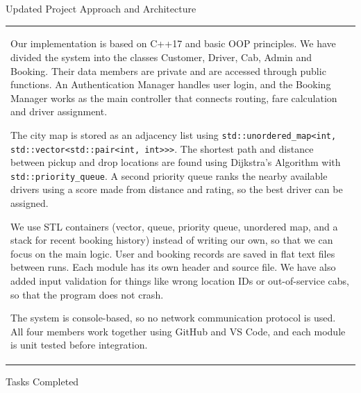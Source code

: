 \documentclass[12pt,a4paper]{article}
\newcommand{\sectiontitle}[1]{%
    {\color{GEUBlue}
    \fontsize{18}{22}\selectfont #1}
}
\newcommand{\answerbox}[2]{%
    \begin{tabularx}{\textwidth}{
        |>{\RaggedRight\arraybackslash}X|}
        \hline
        \parbox[t][#1][t]{\dimexpr\linewidth-12pt\relax}{
            \vspace{5pt}
            \fontsize{11}{13}\selectfont #2
        }\\
        \hline
    \end{tabularx}
}
\begin{document}
\vspace{0.70cm}

\sectiontitle{Updated Project Approach and Architecture}

\vspace{0.05cm}

\vspace{0.25cm}

\answerbox{7.60cm}{
Our implementation is based on C++17 and basic OOP principles. We have divided the system into the classes Customer, Driver, Cab, Admin and Booking. Their data members are private and are accessed through public functions. An Authentication Manager handles user login, and the Booking Manager works as the main controller that connects routing, fare calculation and driver assignment.

The city map is stored as an adjacency list using \texttt{std::unordered\_map<int, std::vector<std::pair<int, int>{}>{}>}. The shortest path and distance between pickup and drop locations are found using Dijkstra's Algorithm with \texttt{std::priority\_queue}. A second priority queue ranks the nearby available drivers using a score made from distance and rating, so the best driver can be assigned.

We use STL containers (vector, queue, priority queue, unordered map, and a stack for recent booking history) instead of writing our own, so that we can focus on the main logic. User and booking records are saved in flat text files between runs. Each module has its own header and source file. We have also added input validation for things like wrong location IDs or out-of-service cabs, so that the program does not crash.

The system is console-based, so no network communication protocol is used. All four members work together using GitHub and VS Code, and each module is unit tested before integration.
}

\newpage

\vspace*{0.20cm}

\sectiontitle{Tasks Completed}

\vspace{0.05cm}

\vspace{0.20cm}
\end{document}
